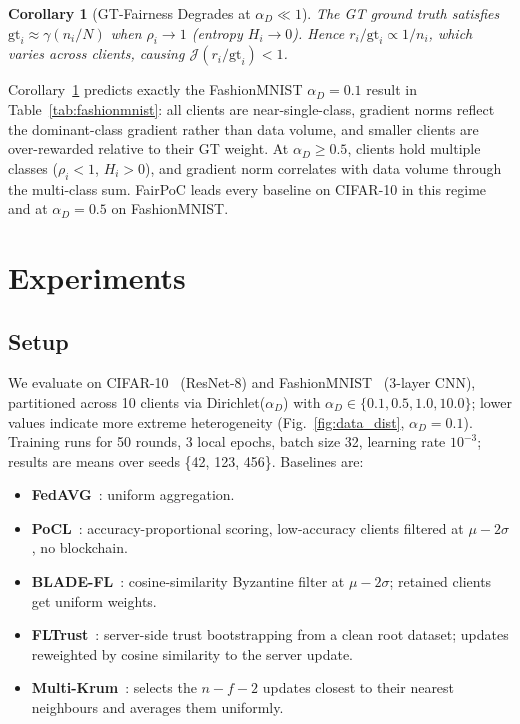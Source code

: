 \documentclass[conference]{IEEEtran}
\newtheorem{corollary}{Corollary}[proposition]
\theoremstyle{remark}
\begin{document}
\begin{corollary}[GT-Fairness Degrades at $\alpha_D \ll 1$]
\label{cor:degrade}
The GT ground truth satisfies $\mathrm{gt}_i \approx \gamma (n_i/N)$
when $\rho_i \to 1$ (entropy $H_i \to 0$).
Hence $r_i / \mathrm{gt}_i \propto 1/n_i$, which varies across
clients, causing $\mathcal{J}(r_i/\mathrm{gt}_i) < 1$.
\end{corollary}

Corollary~\ref{cor:degrade} predicts exactly the FashionMNIST
$\alpha_D{=}0.1$ result in Table~\ref{tab:fashionmnist}: all clients
are near-single-class, gradient norms reflect the dominant-class
gradient rather than data volume, and smaller clients are
over-rewarded relative to their GT weight.
At $\alpha_D \geq 0.5$, clients hold multiple classes ($\rho_i < 1$,
$H_i > 0$), and gradient norm correlates with data volume through the
multi-class sum. FairPoC leads every baseline on CIFAR-10 in this
regime and at $\alpha_D = 0.5$ on FashionMNIST.

\section{Experiments}

\subsection{Setup}

We evaluate on CIFAR-10~\cite{krizhevsky2009learning} (ResNet-8) and
FashionMNIST~\cite{xiao2017fashion} (3-layer CNN), partitioned across
10 clients via Dirichlet($\alpha_D$) with
$\alpha_D \in \{0.1, 0.5, 1.0, 10.0\}$; lower values indicate more
extreme heterogeneity (Fig.~\ref{fig:data_dist}, $\alpha_D{=}0.1$).
Training runs for 50 rounds, 3 local epochs, batch size 32,
learning rate $10^{-3}$; results are means over seeds \{42, 123, 456\}.
Baselines are:
\begin{itemize}
  \item \textbf{FedAVG}~\cite{mcmahan2017communication}: uniform aggregation.
  \item \textbf{PoCL}~\cite{pocl2024}: accuracy-proportional scoring,
        low-accuracy clients filtered at $\mu - 2\sigma$, no blockchain.
  \item \textbf{BLADE-FL}~\cite{bladefl2022}: cosine-similarity Byzantine
        filter at $\mu - 2\sigma$; retained clients get uniform weights.
  \item \textbf{FLTrust}~\cite{cao2020fltrust}: server-side trust
        bootstrapping from a clean root dataset; updates reweighted by
        cosine similarity to the server update.
  \item \textbf{Multi-Krum}~\cite{blanchard2017krum}: selects the
        $n-f-2$ updates closest to their nearest neighbours and averages
        them uniformly.
\end{itemize}
\end{document}
